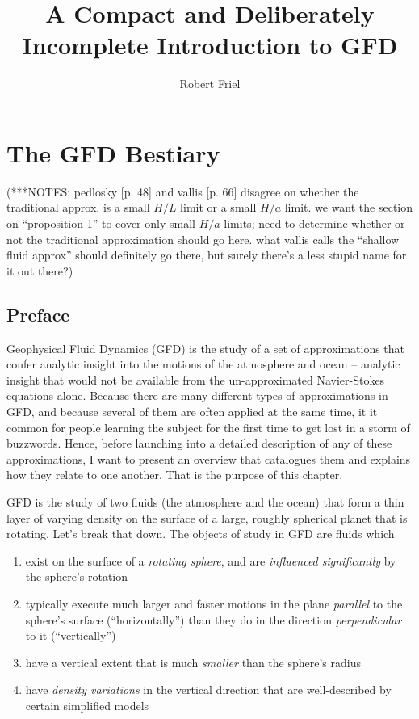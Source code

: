 \documentclass[11pt]{book}
\title{A Compact and Deliberately Incomplete Introduction to GFD}
\author{Robert Friel}
\begin{document}
\maketitle

\tableofcontents

\chapter{The GFD Bestiary}
(***NOTES: pedlosky [p. 48] and vallis [p. 66] disagree on whether the traditional approx. is a small $H/L$ limit or a small $H/a$ limit.  we want the section on ``proposition 1'' to cover only small $H/a$ limits; need to determine whether or not the traditional approximation should go here.  what vallis calls the ``shallow fluid approx'' should definitely go there, but surely there's a less stupid name for it out there?)
\section{Preface}
Geophysical Fluid Dynamics (GFD) is the study of a set of approximations that confer analytic insight into the motions of the atmosphere and ocean -- analytic insight that would not be available from the un-approximated Navier-Stokes equations alone.  Because there are many different types of approximations in GFD, and because several of them are often applied at the same time, it it common for people learning the subject for the first time to get lost in a storm of buzzwords.  Hence, before launching into a detailed description of any of these approximations, I want to present an overview that catalogues them and explains how they relate to one another.  That is the purpose of this chapter.

GFD is the study of two fluids (the atmosphere and the ocean) that form a thin layer of varying density on the surface of a large, roughly spherical planet that is rotating.  Let's break that down.  The objects of study in GFD are fluids which

\begin{enumerate}
\item{exist on the surface of a \emph{rotating sphere}, and are \emph{influenced significantly} by the sphere's rotation}
\item{typically execute much larger and faster motions in the plane \emph{parallel} to the sphere's surface (``horizontally'') than they do in the direction \emph{perpendicular} to it (``vertically'')}
\item{have a vertical extent that is much \emph{smaller} than the sphere's radius}
\item{have \emph{density variations} in the vertical direction that are well-described by certain simplified models}
\end{enumerate}
\end{document}
